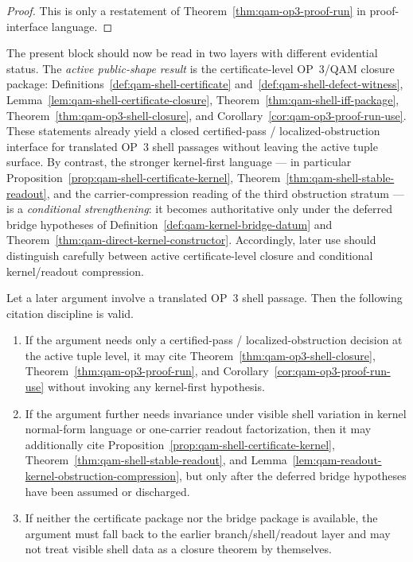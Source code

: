 \begin{proof}
This is only a restatement of Theorem~\ref{thm:qam-op3-proof-run} in proof-interface language.
\end{proof}


\begin{remark}\label{rem:qam-op3-status-separation}
The present block should now be read in two layers with different evidential status. The \emph{active public-shape result} is the certificate-level OP~3/QAM closure package: Definitions~\ref{def:qam-shell-certificate} and~\ref{def:qam-shell-defect-witness}, Lemma~\ref{lem:qam-shell-certificate-closure}, Theorem~\ref{thm:qam-shell-iff-package}, Theorem~\ref{thm:qam-op3-shell-closure}, and Corollary~\ref{cor:qam-op3-proof-run-use}. These statements already yield a closed certified-pass / localized-obstruction interface for translated OP~3 shell passages without leaving the active tuple surface. By contrast, the stronger kernel-first language --- in particular Proposition~\ref{prop:qam-shell-certificate-kernel}, Theorem~\ref{thm:qam-shell-stable-readout}, and the carrier-compression reading of the third obstruction stratum --- is a \emph{conditional strengthening}: it becomes authoritative only under the deferred bridge hypotheses of Definition~\ref{def:qam-kernel-bridge-datum} and Theorem~\ref{thm:qam-direct-kernel-constructor}. Accordingly, later use should distinguish carefully between active certificate-level closure and conditional kernel/readout compression.
\end{remark}

\begin{proposition}\label{prop:qam-op3-citation-use-rule}
Let a later argument involve a translated OP~3 shell passage. Then the following citation discipline is valid.
\begin{enumerate}[leftmargin=2em,label=(\roman*)]
  \item If the argument needs only a certified-pass / localized-obstruction decision at the active tuple level, it may cite Theorem~\ref{thm:qam-op3-shell-closure}, Theorem~\ref{thm:qam-op3-proof-run}, and Corollary~\ref{cor:qam-op3-proof-run-use} without invoking any kernel-first hypothesis.
  \item If the argument further needs invariance under visible shell variation in kernel normal-form language or one-carrier readout factorization, then it may additionally cite Proposition~\ref{prop:qam-shell-certificate-kernel}, Theorem~\ref{thm:qam-shell-stable-readout}, and Lemma~\ref{lem:qam-readout-kernel-obstruction-compression}, but only after the deferred bridge hypotheses have been assumed or discharged.
  \item If neither the certificate package nor the bridge package is available, the argument must fall back to the earlier branch/shell/readout layer and may not treat visible shell data as a closure theorem by themselves.
\end{enumerate}
\end{proposition}

